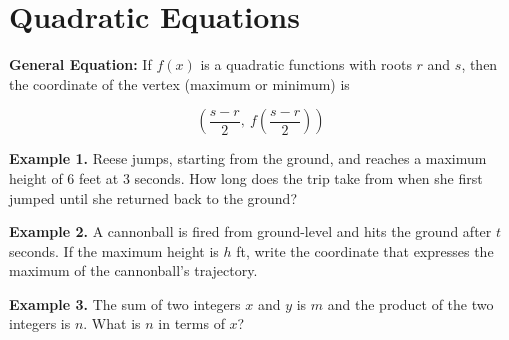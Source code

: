 \section{Quadratic Equations}

\bigskip
\textbf{General Equation:} If $f(x)$ is a quadratic functions with roots $r$ and $s$, then the coordinate of the vertex (maximum or minimum) is

\[\left(\frac{s-r}{2},\ f\left(\frac{s-r}{2}\right)\right)\]

\vfill
\textbf{Example 1.} Reese jumps, starting from the ground, and reaches a maximum height of 6 feet at 3 seconds. How long does the trip take from when she first jumped until she returned back to the ground?

\vfill
\textbf{Example 2.} A cannonball is fired from ground-level and hits the ground after $t$ seconds. If the maximum height is $h$ ft, write the coordinate that expresses the maximum of the cannonball's trajectory.

\vfill
\textbf{Example 3.} The sum of two integers $x$ and $y$ is $m$ and the product of the two integers is $n$. What is $n$ in terms of $x$?

